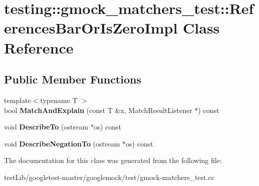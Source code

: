 \hypertarget{classtesting_1_1gmock__matchers__test_1_1ReferencesBarOrIsZeroImpl}{}\section{testing\+:\+:gmock\+\_\+matchers\+\_\+test\+:\+:References\+Bar\+Or\+Is\+Zero\+Impl Class Reference}
\label{classtesting_1_1gmock__matchers__test_1_1ReferencesBarOrIsZeroImpl}
\subsection*{Public Member Functions}
\begin{DoxyCompactItemize}
\item 
\mbox{\label{classtesting_1_1gmock__matchers__test_1_1ReferencesBarOrIsZeroImpl_ac74ff2f707bebea05a995beb77c77041}} 
{\footnotesize template$<$typename T $>$ }\\bool {\bfseries Match\+And\+Explain} (const T \&x, Match\+Result\+Listener $\ast$) const
\item 
\mbox{\label{classtesting_1_1gmock__matchers__test_1_1ReferencesBarOrIsZeroImpl_a8d8496ad72753723598efd45e6a4dcbf}} 
void {\bfseries Describe\+To} (ostream $\ast$os) const
\item 
\mbox{\label{classtesting_1_1gmock__matchers__test_1_1ReferencesBarOrIsZeroImpl_a849b65d96bf7a31b7b0e81005e466605}} 
void {\bfseries Describe\+Negation\+To} (ostream $\ast$os) const
\end{DoxyCompactItemize}


The documentation for this class was generated from the following file\+:\begin{DoxyCompactItemize}
\item 
test\+Lib/googletest-\/master/googlemock/test/gmock-\/matchers\+\_\+test.\+cc\end{DoxyCompactItemize}
